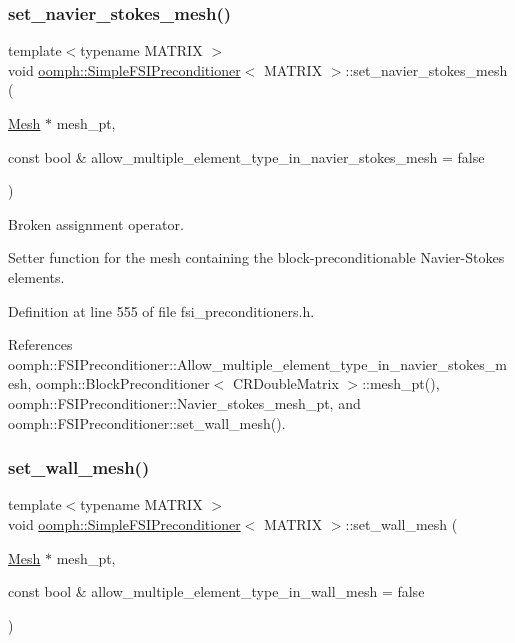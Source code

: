 \subsubsection{\texorpdfstring{set\+\_\+navier\+\_\+stokes\+\_\+mesh()}{set\_navier\_stokes\_mesh()}}
{\footnotesize\ttfamily template$<$typename M\+A\+T\+R\+IX $>$ \\
void \hyperlink{classoomph_1_1SimpleFSIPreconditioner}{oomph\+::\+Simple\+F\+S\+I\+Preconditioner}$<$ M\+A\+T\+R\+IX $>$\+::set\+\_\+navier\+\_\+stokes\+\_\+mesh (\begin{DoxyParamCaption}\item[{\hyperlink{classoomph_1_1Mesh}{Mesh} $\ast$}]{mesh\+\_\+pt,  }\item[{const bool \&}]{allow\+\_\+multiple\+\_\+element\+\_\+type\+\_\+in\+\_\+navier\+\_\+stokes\+\_\+mesh = {\ttfamily false} }\end{DoxyParamCaption})\hspace{0.3cm}{\ttfamily [inline]}}



Broken assignment operator. 

Setter function for the mesh containing the block-\/preconditionable Navier-\/\+Stokes elements. 

Definition at line 555 of file fsi\+\_\+preconditioners.\+h.



References oomph\+::\+F\+S\+I\+Preconditioner\+::\+Allow\+\_\+multiple\+\_\+element\+\_\+type\+\_\+in\+\_\+navier\+\_\+stokes\+\_\+mesh, oomph\+::\+Block\+Preconditioner$<$ C\+R\+Double\+Matrix $>$\+::mesh\+\_\+pt(), oomph\+::\+F\+S\+I\+Preconditioner\+::\+Navier\+\_\+stokes\+\_\+mesh\+\_\+pt, and oomph\+::\+F\+S\+I\+Preconditioner\+::set\+\_\+wall\+\_\+mesh().

\mbox{\label{classoomph_1_1SimpleFSIPreconditioner_a324b53aaedfc8f0a2cc3da921ef94686}} 
\subsubsection{\texorpdfstring{set\+\_\+wall\+\_\+mesh()}{set\_wall\_mesh()}}
{\footnotesize\ttfamily template$<$typename M\+A\+T\+R\+IX $>$ \\
void \hyperlink{classoomph_1_1SimpleFSIPreconditioner}{oomph\+::\+Simple\+F\+S\+I\+Preconditioner}$<$ M\+A\+T\+R\+IX $>$\+::set\+\_\+wall\+\_\+mesh (\begin{DoxyParamCaption}\item[{\hyperlink{classoomph_1_1Mesh}{Mesh} $\ast$}]{mesh\+\_\+pt,  }\item[{const bool \&}]{allow\+\_\+multiple\+\_\+element\+\_\+type\+\_\+in\+\_\+wall\+\_\+mesh = {\ttfamily false} }\end{DoxyParamCaption})\hspace{0.3cm}{\ttfamily [inline]}}



